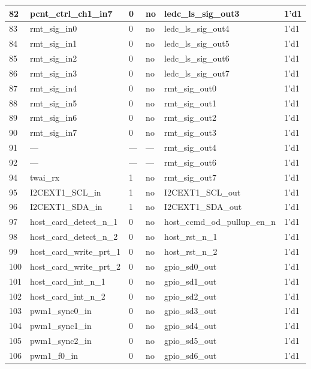 \begin{longtable}[c]{|p{1cm}|p{3.3cm}|p{1.5cm}|p{2.4cm}|p{4.3cm}|p{2.5cm}| }
    82 & pcnt\_ctrl\_ch1\_in7 & 0 & no & ledc\_ls\_sig\_out3 & 1'd1 \\ \hline
    83 & rmt\_sig\_in0 & 0 & no & ledc\_ls\_sig\_out4 & 1'd1 \\ \hline
    84 & rmt\_sig\_in1 & 0 & no & ledc\_ls\_sig\_out5 & 1'd1 \\ \hline
    85 & rmt\_sig\_in2 & 0 & no & ledc\_ls\_sig\_out6 & 1'd1 \\ \hline
    86 & rmt\_sig\_in3 & 0 & no & ledc\_ls\_sig\_out7 & 1'd1 \\ \hline
    87 & rmt\_sig\_in4 & 0 & no & rmt\_sig\_out0 & 1'd1 \\ \hline
    88 & rmt\_sig\_in5 & 0 & no & rmt\_sig\_out1 & 1'd1 \\ \hline
    89 & rmt\_sig\_in6 & 0 & no & rmt\_sig\_out2 & 1'd1 \\ \hline
    90 & rmt\_sig\_in7 & 0 & no & rmt\_sig\_out3 & 1'd1 \\ \hline
    91 & --- & --- & ---  & rmt\_sig\_out4 & 1'd1 \\ \hline
    92 & --- & --- & --- & rmt\_sig\_out6 & 1'd1 \\ \hline
    94 & twai\_rx & 1 & no & rmt\_sig\_out7 & 1'd1 \\ \hline
    95 & I2CEXT1\_SCL\_in & 1 & no & I2CEXT1\_SCL\_out & 1'd1 \\ \hline
    96 & I2CEXT1\_SDA\_in & 1 & no & I2CEXT1\_SDA\_out & 1'd1 \\ \hline
    97 & host\_card\_detect\_n\_1 & 0 & no & host\_ccmd\_od\_pullup\_en\_n & 1'd1 \\ \hline
    98 & host\_card\_detect\_n\_2 & 0 & no & host\_rst\_n\_1 & 1'd1 \\ \hline
    99 & host\_card\_write\_prt\_1 & 0 & no & host\_rst\_n\_2 & 1'd1 \\ \hline
    100 & host\_card\_write\_prt\_2 & 0 & no & gpio\_sd0\_out & 1'd1 \\ \hline
    101 & host\_card\_int\_n\_1 & 0 & no & gpio\_sd1\_out & 1'd1 \\ \hline
    102 & host\_card\_int\_n\_2 & 0 & no & gpio\_sd2\_out & 1'd1 \\ \hline
    103 & pwm1\_sync0\_in & 0 & no & gpio\_sd3\_out & 1'd1 \\ \hline
    104 & pwm1\_sync1\_in & 0 & no & gpio\_sd4\_out & 1'd1 \\ \hline
    105 & pwm1\_sync2\_in & 0 & no & gpio\_sd5\_out & 1'd1 \\ \hline
    106 & pwm1\_f0\_in & 0 & no & gpio\_sd6\_out & 1'd1 \\ \hline

\end{longtable}
